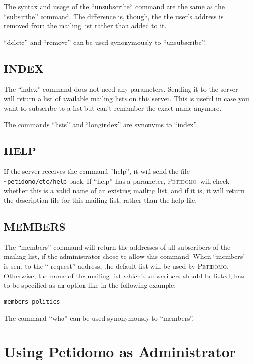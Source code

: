 \documentclass[a4paper]{report}
\newcommand{\Petidomo}{{\scshape Peti\-domo}}
\newcommand{\file}[1]{{\tt #1}}
\begin{document}
The syntax and usage of the ``unsubscribe`` command are the same as the
``subscribe'' command. The difference is, though, the the user's address
is removed from the mailing list rather than added to it.

``delete'' and ``remove'' can be used synonymously to ``unsubscribe''.

\section{INDEX}

The ``index'' command does not need any parameters. Sending it to the
server will return a list of available mailing lists on this server.
This is useful in case you want to subscribe to a list but can't
remember the exact name anymore.

The commands ``lists'' and ``longindex'' are synonyms to ``index''.

\section{HELP}

If the server receives the command ``help'', it will send the file
\file{\~{}peti\-domo/etc/help} back. If ``help'' has a parameter,
\Petidomo\ will check whether this is a valid name of an existing
mailing list, and if it is, it will return the description file for
this mailing list, rather than the help-file.

\section{MEMBERS}

The ``members'' command will return the addresses of all subscribers
of the mailing list, if the administrator chose to allow this command.
When ``members' is sent to the ``-request''-address, the default list
will be used by \Petidomo. Otherwise, the name of the mailing list
which's subscribers should be listed, has to be specified as an option
like in the following example:
\begin{verbatim}
members politics
\end{verbatim}

The command ``who'' can be used synonymously to ``members''.

\chapter{Using Petidomo as Administrator}
\label{petidomo as admin}
\end{document}
